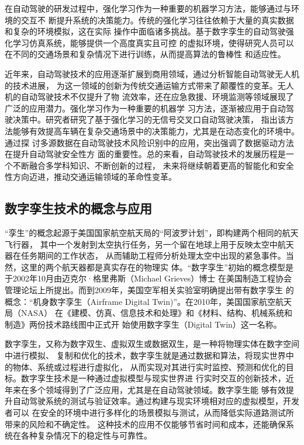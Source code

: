 在自动驾驶的研发过程中，强化学习作为一种重要的机器学习方法，能够通过与环境的交互不
断提升系统的决策能力。传统的强化学习往往依赖于大量的真实数据和复杂的环境模拟，这在实际
操作中面临诸多挑战。基于数字孪生的自动驾驶强化学习仿真系统，能够提供一个高度真实且可控
的虚拟环境\cite{梁恩云2021基于数字孪生的自动驾驶交通场景构建研究}，使得研究人员可以在不同的交通场景和复杂情况下进行训练，从而提高算法的鲁棒性
和适应性。

近年来，自动驾驶技术的应用逐渐扩展到商用领域，通过分析智能自动驾驶无人机的技术进展，
为这一领域的创新为传统交通运输方式带来了颠覆性的变革\cite{方韶剑2024基于深度学习的智能自动驾驶无人机技术分析}。无人机的自动驾驶技术不仅提升了物
流效率，还在应急救援、环境监测等领域展现了广泛的应用潜力。强化学习作为一种重要的机器学
习方法，逐渐被应用于自动驾驶决策中。研究者研究了基于强化学习的无信号交叉口自动驾驶决策\cite{李文娜2024自动驾驶汽车闯红灯预警数字孪生道路测试}，
指出该方法能够有效提高车辆在复杂交通场景中的决策能力，尤其是在动态变化的环境中。通过探
讨多源数据在自动驾驶技术风险识别中的应用，突出强调了数据驱动方法在提升自动驾驶安全性方
面的重要性。总的来看，自动驾驶技术的发展历程是一个不断融合多学科知识、不断创新的过程，
未来将继续朝着更高的智能化和安全性方向迈进，推动交通运输领域的革命性变革。







\subsection{数字孪生技术的概念与应用}

“孪生”的概念起源于美国国家航空航天局的“阿波罗计划”，即构建两个相同的航天飞行器，
其中一个发射到太空执行任务，另一个留在地球上用于反映太空中航天器在任务期间的工作状态，
从而辅助工程师分析处理太空中出现的紧急事件。当然，这里的两个航天器都是真实存在的物理实
体。“数字孪生”初始的概念模型是于2002年10月由迈克尔·格里弗斯（Michael Grieves）博士
在美国制造工程协会管理论坛上所提出。而到2009年，美国空军相关实验室明确提出带有数字孪生
的概念：“机身数字孪生（Airframe Digital Twin)”。在2010年，美国国家航空航天局（NASA）
在《建模、仿真、信息技术和处理》和《材料、结构、机械系统和制造》两份技术路线图中正式开
始使用数字孪生（Digital Twin）这一名称。

数字孪生，又称为数字双生、虚拟双生或数据双生，是一种将物理实体在数字空间中进行模拟、
复制和优化的技术，数字孪生就是通过数据和算法，将现实世界中的物体、系统或过程进行虚拟化，
从而实现对其进行实时监控、预测和优化的目标。数字孪生技术是一种通过虚拟模型与现实世界进
行实时交互的创新技术，近年来在多个领域得到了广泛应用，尤其是在自动驾驶领域\cite{王庆涛2021数字孪生技术在自动驾驶测试领域的应用研究概述}。数字孪生能
够有效提升自动驾驶系统的测试与验证效率。通过构建与现实环境相对应的虚拟模型，开发者可以
在安全的环境中进行多样化的场景模拟与测试，从而降低实际道路测试所带来的风险和不确定性\cite{葛雨明2020基于数字孪生的网联自动驾驶测试方法研究}。
这种技术的应用不仅能够节省时间和成本，还能确保系统在各种复杂情况下的稳定性与可靠性。

